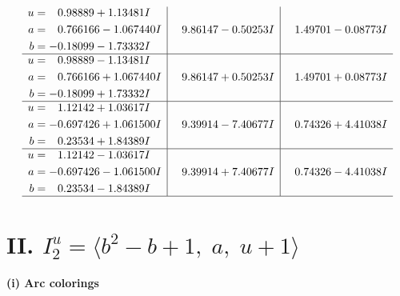 \documentclass[1p]{elsarticle_modified}
\theoremstyle{definition}
\begin{document}
$$\begin{array}{c|c|c}
\begin{aligned}
u &= \phantom{-}0.98889 + 1.13481 I \\
a &= \phantom{-}0.766166 - 1.067440 I \\
b &= -0.18099 - 1.73332 I\end{aligned}
 & \phantom{-}9.86147 - 0.50253 I & \phantom{-}1.49701 - 0.08773 I \\ \hline\begin{aligned}
u &= \phantom{-}0.98889 - 1.13481 I \\
a &= \phantom{-}0.766166 + 1.067440 I \\
b &= -0.18099 + 1.73332 I\end{aligned}
 & \phantom{-}9.86147 + 0.50253 I & \phantom{-}1.49701 + 0.08773 I \\ \hline\begin{aligned}
u &= \phantom{-}1.12142 + 1.03617 I \\
a &= -0.697426 + 1.061500 I \\
b &= \phantom{-}0.23534 + 1.84389 I\end{aligned}
 & \phantom{-}9.39914 - 7.40677 I & \phantom{-}0.74326 + 4.41038 I \\ \hline\begin{aligned}
u &= \phantom{-}1.12142 - 1.03617 I \\
a &= -0.697426 - 1.061500 I \\
b &= \phantom{-}0.23534 - 1.84389 I\end{aligned}
 & \phantom{-}9.39914 + 7.40677 I & \phantom{-}0.74326 - 4.41038 I\\
 \hline 
 \end{array}$$\newpage\newpage\renewcommand{\arraystretch}{1}
\centering \section*{II. $I^u_{2}= \langle b^2- b+1,\;a,\;u+1 \rangle$}
\flushleft \textbf{(i) Arc colorings}\\
\end{document}
